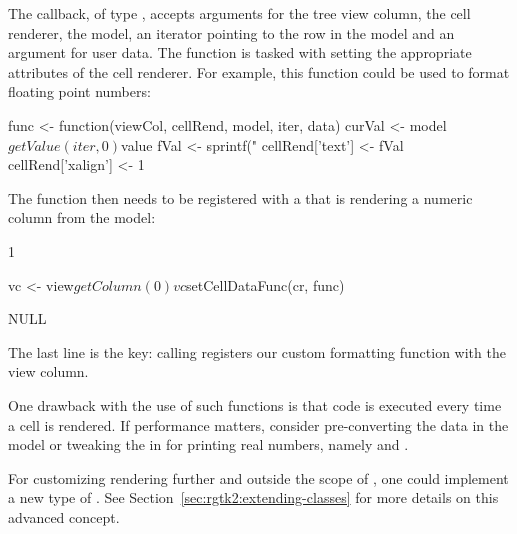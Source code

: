 The callback, of type , accepts arguments
for the tree view column, the cell renderer, the model, an iterator
pointing to the row in the model and an argument for user data. The
function is tasked with setting the appropriate attributes of the cell
renderer. For example, this function could be used to format floating
point numbers:
\begin{Schunk}
\begin{Sinput}
 func <- function(viewCol, cellRend, model, iter, data) {
   curVal <- model$getValue(iter, 0)$value
   fVal <- sprintf("%
   cellRend['text'] <- fVal
   cellRend['xalign'] <- 1
 }
\end{Sinput}
\end{Schunk}
%
The function then needs to be registered with a
 that is rendering a numeric column from the model:
\begin{Schunk}
\begin{Soutput}
[1] 1
\end{Soutput}
\begin{Sinput}
 vc <- view$getColumn(0)
 vc$setCellDataFunc(cr, func)
\end{Sinput}
\begin{Soutput}
NULL
\end{Soutput}
\end{Schunk}
%
The last line is the key: calling
 registers our custom
formatting function with the view column.

One drawback with the use of such functions is that \R\/ code is
executed every time a cell is rendered. If performance matters,
consider pre-converting the data in the model or tweaking the
 in \R\/ for printing real numbers, namely 
and .

For customizing rendering further and outside the scope of
, one could implement a new type of
. See Section~\ref{sec:rgtk2:extending-classes} for
more details on this advanced concept.


